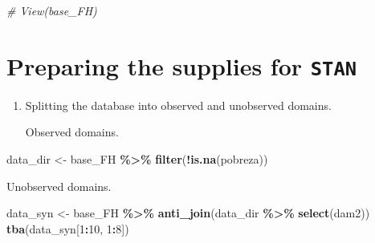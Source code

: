 \documentclass[
  12pt,
]{book}
\newenvironment{Shaded}{\begin{snugshade}}{\end{snugshade}}
\newcommand{\CommentTok}[1]{\textcolor[rgb]{0.56,0.35,0.01}{\textit{#1}}}
\newcommand{\DecValTok}[1]{\textcolor[rgb]{0.00,0.00,0.81}{#1}}
\newcommand{\FunctionTok}[1]{\textcolor[rgb]{0.13,0.29,0.53}{\textbf{#1}}}
\newcommand{\NormalTok}[1]{#1}
\newcommand{\OtherTok}[1]{\textcolor[rgb]{0.56,0.35,0.01}{#1}}
\newcommand{\SpecialCharTok}[1]{\textcolor[rgb]{0.81,0.36,0.00}{\textbf{#1}}}
\begin{document}
\begin{Shaded}
\begin{Highlighting}[]
\CommentTok{\# View(base\_FH)}
\end{Highlighting}
\end{Shaded}

\hypertarget{preparing-the-supplies-for-stan}{%
\section{\texorpdfstring{Preparing the supplies for \texttt{STAN}}{Preparing the supplies for STAN}}\label{preparing-the-supplies-for-stan}}

\begin{enumerate}
\def\labelenumi{\arabic{enumi}.}
\item
  Splitting the database into observed and unobserved domains.

  Observed domains.
\end{enumerate}

\begin{Shaded}
\begin{Highlighting}[]
\NormalTok{data\_dir }\OtherTok{\textless{}{-}}\NormalTok{ base\_FH }\SpecialCharTok{\%\textgreater{}\%} \FunctionTok{filter}\NormalTok{(}\SpecialCharTok{!}\FunctionTok{is.na}\NormalTok{(pobreza))}
\end{Highlighting}
\end{Shaded}

Unobserved domains.

\begin{Shaded}
\begin{Highlighting}[]
\NormalTok{data\_syn }\OtherTok{\textless{}{-}}
\NormalTok{  base\_FH }\SpecialCharTok{\%\textgreater{}\%} \FunctionTok{anti\_join}\NormalTok{(data\_dir }\SpecialCharTok{\%\textgreater{}\%} \FunctionTok{select}\NormalTok{(dam2))}
\FunctionTok{tba}\NormalTok{(data\_syn[}\DecValTok{1}\SpecialCharTok{:}\DecValTok{10}\NormalTok{, }\DecValTok{1}\SpecialCharTok{:}\DecValTok{8}\NormalTok{])}
\end{Highlighting}
\end{Shaded}
\end{document}
